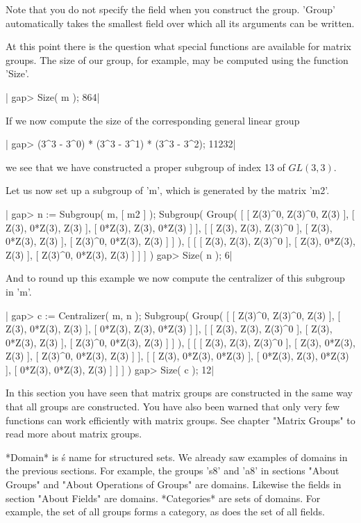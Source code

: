 Note that  you  do not specify  the field  when you construct the  group.
'Group'  automatically  takes  the  smallest field  over  which  all  its
arguments can be written.

At this point there is the question what  special functions are available
for matrix groups.  The size of our group, for  example, may  be computed
using the function 'Size'.

|    gap> Size( m );
    864|

If we now compute the size of the corresponding general linear group

|    gap> (3^3 - 3^0) * (3^3 - 3^1) * (3^3 - 3^2);
    11232|

we  see that  we have  constructed  a  proper subgroup  of  index  13  of
$GL(3,3)$.

Let  us now set  up a subgroup of  'm', which  is generated by the matrix
'm2'.

|    gap> n := Subgroup( m, [ m2 ] );
    Subgroup( Group( [ [ Z(3)^0, Z(3)^0, Z(3) ], [ Z(3), 0*Z(3), Z(3) ],
      [ 0*Z(3), Z(3), 0*Z(3) ] ],
    [ [ Z(3), Z(3), Z(3)^0 ], [ Z(3), 0*Z(3), Z(3) ],
      [ Z(3)^0, 0*Z(3), Z(3) ] ] ),
    [ [ [ Z(3), Z(3), Z(3)^0 ], [ Z(3), 0*Z(3), Z(3) ],
          [ Z(3)^0, 0*Z(3), Z(3) ] ] ] )
    gap> Size( n );
    6|

And  to round up  this  example we now  compute the  centralizer  of this
subgroup in 'm'.

|    gap> c := Centralizer( m, n );
    Subgroup( Group( [ [ Z(3)^0, Z(3)^0, Z(3) ], [ Z(3), 0*Z(3), Z(3) ],
      [ 0*Z(3), Z(3), 0*Z(3) ] ],
    [ [ Z(3), Z(3), Z(3)^0 ], [ Z(3), 0*Z(3), Z(3) ],
      [ Z(3)^0, 0*Z(3), Z(3) ] ] ),
    [ [ [ Z(3), Z(3), Z(3)^0 ], [ Z(3), 0*Z(3), Z(3) ],
          [ Z(3)^0, 0*Z(3), Z(3) ] ],
      [ [ Z(3), 0*Z(3), 0*Z(3) ], [ 0*Z(3), Z(3), 0*Z(3) ],
          [ 0*Z(3), 0*Z(3), Z(3) ] ] ] )
    gap> Size( c );
    12|

In this section you have seen  that matrix groups  are constructed in the
same way that all groups are constructed.  You have also been warned that
only very few  functions  can work efficiently with matrix  groups.   See
chapter "Matrix Groups" to read more about matrix groups.


*Domain* is {\GAP}\'s name for structured sets.  We already saw  examples
of  domains in  the previous sections.  For example, the groups 's8'  and
'a8' in sections  "About  Groups" and  "About  Operations of  Groups" are
domains.  Likewise the  fields  in section  "About Fields"  are  domains.
*Categories*  are  sets  of domains.  For example,  the set of all groups
forms a category, as does the set of all fields.

